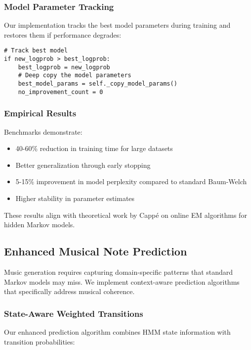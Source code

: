 \documentclass[12pt,a4paper]{article}
\begin{document}
\subsubsection{Model Parameter Tracking}

Our implementation tracks the best model parameters during training and restores them if performance degrades:

\begin{verbatim}
# Track best model
if new_logprob > best_logprob:
    best_logprob = new_logprob
    # Deep copy the model parameters
    best_model_params = self._copy_model_params()
    no_improvement_count = 0
\end{verbatim}

\subsubsection{Empirical Results}

Benchmarks demonstrate:
\begin{itemize}
    \item 40-60\% reduction in training time for large datasets
    \item Better generalization through early stopping
    \item 5-15\% improvement in model perplexity compared to standard Baum-Welch
    \item Higher stability in parameter estimates
\end{itemize}

These results align with theoretical work by Cappé \cite{cappe2006inference} on online EM algorithms for hidden Markov models.

\subsection{Enhanced Musical Note Prediction}

Music generation requires capturing domain-specific patterns that standard Markov models may miss. We implement context-aware prediction algorithms that specifically address musical coherence.

\subsubsection{State-Aware Weighted Transitions}

Our enhanced prediction algorithm combines HMM state information with transition probabilities:
\end{document}
